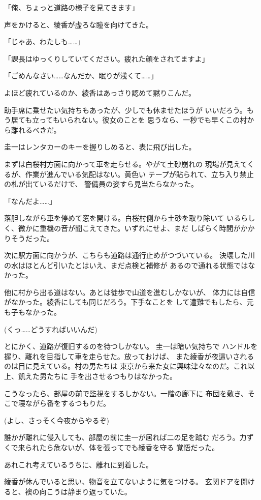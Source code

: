 ﻿\documentclass[
    book,tate,
    line_length=30zw,
    jafontsize=12pt,
    paper=b5j,
    landscape,
    ]{jlreq}
\begin{document}
「俺、ちょっと道路の様子を見てきます」

声をかけると、綾香が虚ろな瞳を向けてきた。

「じゃあ、わたしも……」

「課長はゆっくりしていてください。疲れた顔をされてますよ」

「ごめんなさい……なんだか、眠りが浅くて……」

よほど疲れているのか、綾香はあっさり認めて黙りこんだ。

助手席に乗せたい気持ちもあったが、少しでも休ませたほうが
いいだろう。もう居ても立ってもいられない。彼女のことを
思うなら、一秒でも早くこの村から離れるべきだ。

圭一はレンタカーのキーを握りしめると、表に飛び出した。

まずは白桜村方面に向かって車を走らせる。やがて土砂崩れの
現場が見えてくるが、作業が進んでいる気配はない。黄色い
テープが貼られて、立ち入り禁止の札が出ているだけで、
警備員の姿すら見当たらなかった。

「なんだよ……」

落胆しながら車を停めて窓を開ける。白桜村側から土砂を取り除いて
いるらしく、微かに重機の音が聞こえてきた。いずれにせよ、まだ
しばらく時間がかかりそうだった。

次に駅方面に向かうが、こちらも道路は通行止めがつづいている。
決壊した川の水はほとんど引いたとはいえ、まだ点検と補修が
あるので通れる状態ではなかった。

他に村から出る道はない。あとは徒歩で山道を進むしかないが、
体力には自信がなかった。綾香にしても同じだろう。下手なことを
して遭難でもしたら、元も子もなかった。

(くっ……どうすればいいんだ)

とにかく、道路が復旧するのを待つしかない。 圭一は暗い気持ちで
ハンドルを握り、離れを目指して車を走らせた。放っておけば、
また綾香が夜這いされるのは目に見えている。村の男たちは
東京から来た女に興味津々なのだ。これ以上、飢えた男たちに
手を出させるつもりはなかった。

こうなったら、部屋の前で監視をするしかない。一階の廊下に
布団を敷き、そこで寝ながら番をするつもりだ。

(よし、さっそく今夜からやるぞ)

誰かが離れに侵入しても、部屋の前に圭一が居れば二の足を踏む
だろう。力ずくで来られたら危ないが、体を張ってでも綾香を守る
覚悟だった。

あれこれ考えているうちに、離れに到着した。

綾香が休んでいると思い、物音を立てないように気をつける。
玄関ドアを開けると、襖の向こうは静まり返っていた。
\end{document}
